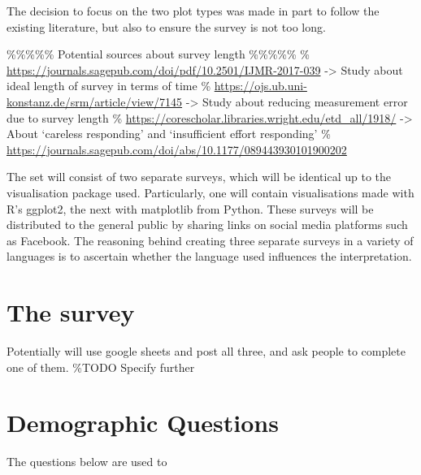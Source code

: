 \documentclass[
  12pt,
  twocolumn]{book}
\begin{document}
The decision to focus on the two plot types was made in part to follow
the existing literature, but also to ensure the survey is not too long.

\%\%\%\%\% Potential sources about survey length \%\%\%\%\% \%
\url{https://journals.sagepub.com/doi/pdf/10.2501/IJMR-2017-039}
-\textgreater{} Study about ideal length of survey in terms of time \%
\url{https://ojs.ub.uni-konstanz.de/srm/article/view/7145}
-\textgreater{} Study about reducing measurement error due to survey
length \% \url{https://corescholar.libraries.wright.edu/etd_all/1918/}
-\textgreater{} About `careless responding' and `insufficient effort
responding' \%
\url{https://journals.sagepub.com/doi/abs/10.1177/089443930101900202}

The set will consist of two separate surveys, which will be identical up
to the visualisation package used. Particularly, one will contain
visualisations made with R's ggplot2, the next with matplotlib from
Python. These surveys will be distributed to the general public by
sharing links on social media platforms such as Facebook. The reasoning
behind creating three separate surveys in a variety of languages is to
ascertain whether the language used influences the interpretation.

\section{The survey}

Potentially will use google sheets and post all three, and ask people to
complete one of them. \%TODO Specify further

\section{\textbf{Demographic Questions}}

The questions below are used to
\end{document}
